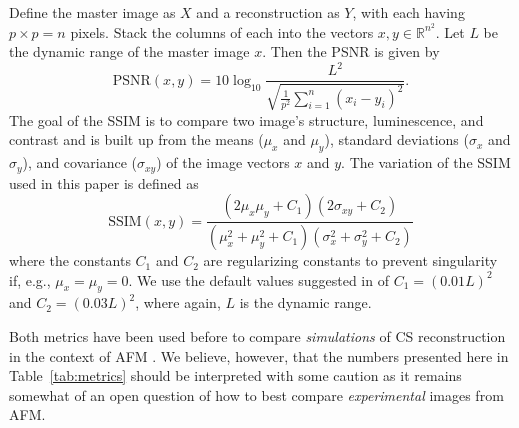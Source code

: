 \documentclass[11pt]{article}
\begin{document}
Define the master image as $X$ and a reconstruction as $Y$, with each having $p\times p=n$ pixels. Stack the columns of each into the vectors $x, y\in\mathbb{R}^{n^2}$. Let $L$ be the dynamic range of the master image $x$. Then the PSNR is given by
\begin{equation*}
  \text{PSNR}(x,y) = 10\log_{10}\frac{L^2}
  {\sqrt{\frac{1}{p^2} \sum_{i=1}^{n}( x_{i} - y_{i})^2}}.
\end{equation*}
The goal of the SSIM is to compare two image's structure, luminescence, and contrast and is built up from the means ($\mu_x$ and $\mu_y$), standard deviations ($\sigma_x$ and $\sigma_y$), and covariance ($\sigma_{xy}$) of the image vectors $x$ and $y$.  
The variation of the SSIM used in this paper is defined as
\begin{equation*}
  \text{SSIM}(x,y) = \frac{(2\mu_x\mu_y + C_1)(2\sigma_{xy}+C_2)}
  {(\mu_x^2 + \mu_y^2 + C_1)(\sigma_x^2 + \sigma_y^2 + C_2)}
\end{equation*}
where the constants $C_1$ and $C_2$ are regularizing constants to prevent singularity if, e.g., $\mu_x=\mu_y=0$. We use the default values suggested in \cite{wang_image_2004} of $C_1=(0.01L)^2$ and ${C_2=(0.03L)^2}$, where again, $L$ is the dynamic range.

Both metrics have been used before to compare \emph{simulations} of CS reconstruction in the context of AFM \cite{oxvig_structure_2017, Luo_nano_2015}. We believe, however, that the numbers presented here in Table~\ref{tab:metrics} should be interpreted with some caution as it remains somewhat of an open question of how to best compare \emph{experimental} images from AFM.
\end{document}
